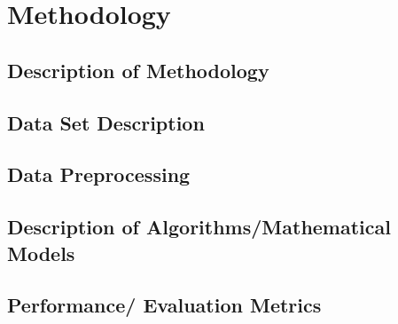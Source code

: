 \chapter{Methodology}
\lipsum[1]
\lipsum[2]
\section{Description of Methodology}
\lipsum[1]
\lipsum[2]
\section{Data Set Description}
\lipsum[1]
\lipsum[2]
\section{Data Preprocessing}
\lipsum[1]
\lipsum[2]
\section{Description of Algorithms/Mathematical Models}
\lipsum[1]
\lipsum[2]
\section{Performance/ Evaluation Metrics}
\lipsum[1]
\lipsum[2]

